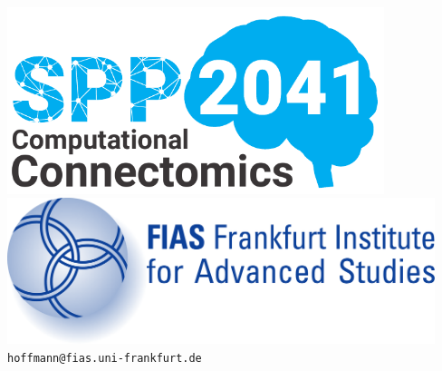 \documentclass[a0,portrait]{a0poster}
\begin{document}
\begin{minipage}[b]{0.25\linewidth}
  \centering
  
  \vspace{-9cm}
  
  \includegraphics[width=11cm]{spp2041_logo.pdf}
  \hspace{2.2cm}
  \includegraphics[width=12.5cm]{FIAS-logo.pdf}\\

  \vspace{2cm}
  \Large \texttt{hoffmann@fias.uni-frankfurt.de}\\
  \vspace{3cm}
\end{minipage}
\vspace{-1.5cm} %

\end{document}
